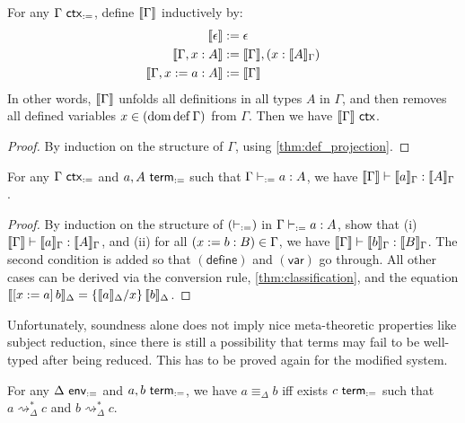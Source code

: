 \documentclass[twoside]{report}
\begin{document}
\begin{proposition}
    \label{thm:def_ctx_projection}
    For any $\Gamma \ctxd$, define $\inter{\Gamma}$ inductively by:
    $$
        \begin{aligned}
            \inter{\epsilon}               & \defeq \epsilon                               \\
            \inter{\Gamma, x : A}          & \defeq \inter{\Gamma}, (x : \inter{A}_\Gamma) \\
            \inter{\Gamma, x \defeq a : A} & \defeq \inter{\Gamma}                         \\
        \end{aligned}
    $$
    In other words, $\inter{\Gamma}$ unfolds all definitions in all types $A$ in $\Gamma$, and then removes all defined variables $x \in (\dom \defn \Gamma)$ from $\Gamma$. Then we have $\inter{\Gamma} \ctxo$.
\end{proposition}

\begin{proof}
    By induction on the structure of $\Gamma$, using \cref{thm:def_projection}.
\end{proof}

\begin{proposition}[Soundness]
    \label{thm:def_soundness}
    For any $\Gamma \ctxd$ and $a, A \termd$ such that $\Gamma \vdashd a : A$, we have $\inter{\Gamma} \vdasho \inter{a}_\Gamma : \inter{A}_\Gamma$.
\end{proposition}

\begin{proof}
    By induction on the structure of $(\vdashd)$ in $\Gamma \vdashd a : A$, show that (i) $\inter{\Gamma} \vdasho \inter{a}_\Gamma : \inter{A}_\Gamma$, and (ii) for all $(x \defeq b : B) \in \Gamma$, we have $\inter{\Gamma} \vdasho \inter{b}_\Gamma : \inter{B}_\Gamma$. The second condition is added so that $(\mathsf{define})$ and $(\mathsf{var})$ go through. All other cases can be derived via the conversion rule, \cref{thm:classification}, and the equation $\inter{\llet x a b}_\Delta = \subst x {\inter{a}_\Delta} {\inter{b}_\Delta}$.
\end{proof}

Unfortunately, soundness alone does not imply nice meta-theoretic properties like subject reduction, since there is still a possibility that terms may fail to be well-typed after being reduced. This has to be proved again for the modified system.

\begin{proposition}
    \label{thm:def_characterisation_of_defeq}
    For any $\Delta \envd$ and $a, b \termd$, we have $a \equiv_\Delta b$ iff exists $c \termd$ such that $a\rightsquigarrow_\Delta^\ast c$ and $b\rightsquigarrow_\Delta^\ast c$.
\end{proposition}
\end{document}
